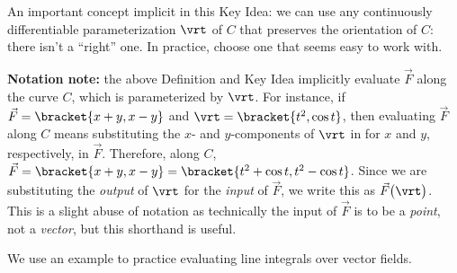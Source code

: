 An important concept implicit in this Key Idea: we can use any continuously differentiable parameterization $\vrt$ of $C$ that preserves the orientation of $C$: there isn't a ``right'' one. In practice, choose one that seems easy to work with. 

\textbf{Notation note:} the above Definition and Key Idea implicitly evaluate $\vec F$ along the curve $C$, which is parameterized by $\vrt$. For instance, if $\vec F =\bracket{x+y,x-y}$ and $\vrt =\bracket{t^2,\cos t}$, then evaluating $\vec F$ along $C$ means substituting the $x$- and $y$-components of $\vrt$ in for $x$ and $y$, respectively, in $\vec F$. Therefore, along $C$, $\vec F =\bracket{x+y,x-y}=\bracket{t^2+\cos t,t^2-\cos t}$. Since we are substituting the \emph{output} of $\vrt$ for the \emph{input} of $\vec F$, we write this as $\vec F\big(\vrt\big)$. This is a slight abuse of notation as technically the input of $\vec F$ is to be a \emph{point}, not a \emph{vector}, but this shorthand is useful.

We use an example to practice evaluating line integrals over vector fields.


